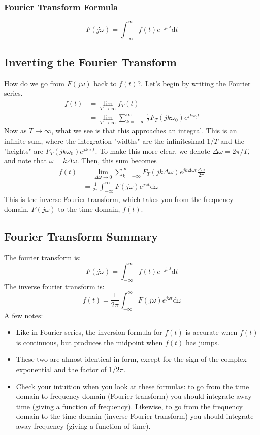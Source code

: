 \documentclass[10pt]{article}
\begin{document}
\subsubsection*{Fourier Transform Formula}
\[F(j\omega) = \int_{-\infty}^\infty f(t) e^{-j\omega t} \text{d}t\]
\subsection*{Inverting the Fourier Transform}
How do we go from $F(j\omega)$ back to $f(t)$?.  Let's begin by writing the Fourier series.
\begin{align*}
    f(t) &= \lim_{T \rightarrow \infty} f_T(t)\\
    &= \lim_{T \rightarrow \infty} \sum_{k = -\infty}^\infty \frac{1}{T} F_T(jk\omega_0)e^{jk\omega_0 t}
\end{align*}
Now as $T \rightarrow \infty$, what we see is that this approaches an integral.  This is an infinite sum, where the integration "widths" are the infinitesimal $1/T$ and the "heights" are $F_T(jk\omega_0)e^{jk\omega_0 t}$.  To make this more clear, we denote $\Delta \omega = 2\pi / T$, and note that $\omega = k\Delta \omega$.  Then, this sum becomes
\begin{align*}
    f(t) &= \lim_{\Delta \omega \rightarrow 0} \sum_{k = -\infty}^\infty F_T(jk\Delta \omega) e^{jk\Delta \omega t} \frac{\Delta \omega}{2\pi}\\
    &= \frac{1}{2\pi} \int_{-\infty}^\infty F(j\omega) e^{j\omega t} \text{d}\omega
\end{align*}
This is the inverse Fourier transform, which takes you from the frequency domain, $F(j\omega)$ to the time domain, $f(t)$.
\subsection*{Fourier Transform Summary}
The fourier transform is:
\[\boxed{F(j\omega) = \int_{-\infty}^\infty} f(t) e^{-j\omega t} \text{d}t\]
The inverse fourier transform is:
\[\boxed{f(t) = \frac{1}{2\pi} \int_{-\infty}^{\infty} F(j\omega)e^{j\omega t} \text{d}\omega}\]
A few notes:
\begin{itemize}
    \item Like in Fourier series, the inversion formula for $f(t)$ is accurate when $f(t)$ is continuous, but produces the midpoint when $f(t)$ has jumps.
    \item These two are almost identical in form, except for the sign of the complex exponential and the factor of $1/2\pi$.
    \item Check your intuition when you look at these formulas: to go from the time domain to frequency domain (Fourier transform) you should integrate away time (giving a function of frequency).  Likewise, to go from the frequency domain to the time domain (inverse Fourier transform) you should integrate away frequency (giving a function of time).
\end{itemize}
\end{document}
